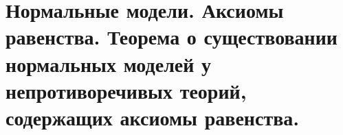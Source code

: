 \section{Нормальные модели. Аксиомы равенства. Теорема о существовании нормальных моделей у непротиворечивых теорий, содержащих аксиомы равенства.}